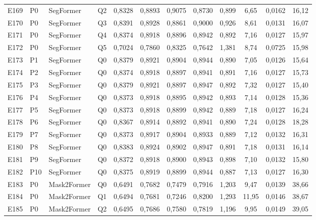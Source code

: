 \begin{longtable}{lllllccccccc}
E169 & P0 & SegFormer & Q2 & 0{,}8328 & 0{,}8893 & 0{,}9075 & 0{,}8730 & 0{,}899 & 6{,}65 & 0{,}0162 & 16{,}12 \\
E170 & P0 & SegFormer & Q3 & 0{,}8391 & 0{,}8928 & 0{,}8861 & 0{,}9000 & 0{,}926 & 8{,}61 & 0{,}0131 & 16{,}07 \\
E171 & P0 & SegFormer & Q4 & 0{,}8374 & 0{,}8918 & 0{,}8896 & 0{,}8942 & 0{,}892 & 7{,}16 & 0{,}0127 & 15{,}97 \\
E172 & P0 & SegFormer & Q5 & 0{,}7024 & 0{,}7860 & 0{,}8325 & 0{,}7642 & 1{,}381 & 8{,}74 & 0{,}0725 & 15{,}98 \\
E173 & P1 & SegFormer & Q0 & 0{,}8379 & 0{,}8921 & 0{,}8904 & 0{,}8944 & 0{,}890 & 7{,}05 & 0{,}0126 & 15{,}64 \\
E174 & P2 & SegFormer & Q0 & 0{,}8374 & 0{,}8918 & 0{,}8897 & 0{,}8941 & 0{,}891 & 7{,}16 & 0{,}0127 & 15{,}73 \\
E175 & P3 & SegFormer & Q0 & 0{,}8379 & 0{,}8921 & 0{,}8897 & 0{,}8947 & 0{,}892 & 7{,}32 & 0{,}0127 & 15{,}40 \\
E176 & P4 & SegFormer & Q0 & 0{,}8373 & 0{,}8918 & 0{,}8895 & 0{,}8942 & 0{,}893 & 7{,}14 & 0{,}0128 & 15{,}36 \\
E177 & P5 & SegFormer & Q0 & 0{,}8373 & 0{,}8918 & 0{,}8899 & 0{,}8942 & 0{,}889 & 7{,}18 & 0{,}0127 & 16{,}24 \\
E178 & P6 & SegFormer & Q0 & 0{,}8367 & 0{,}8914 & 0{,}8892 & 0{,}8941 & 0{,}890 & 7{,}24 & 0{,}0128 & 18{,}28 \\
E179 & P7 & SegFormer & Q0 & 0{,}8373 & 0{,}8917 & 0{,}8904 & 0{,}8933 & 0{,}889 & 7{,}12 & 0{,}0132 & 16{,}31 \\
E180 & P8 & SegFormer & Q0 & 0{,}8383 & 0{,}8924 & 0{,}8902 & 0{,}8947 & 0{,}891 & 7{,}18 & 0{,}0131 & 16{,}14 \\
E181 & P9 & SegFormer & Q0 & 0{,}8372 & 0{,}8918 & 0{,}8900 & 0{,}8943 & 0{,}898 & 7{,}10 & 0{,}0132 & 15{,}80 \\
E182 & P10 & SegFormer & Q0 & 0{,}8375 & 0{,}8919 & 0{,}8899 & 0{,}8944 & 0{,}887 & 7{,}13 & 0{,}0127 & 16{,}30 \\
E183 & P0 & Mask2Former & Q0 & 0{,}6491 & 0{,}7682 & 0{,}7479 & 0{,}7916 & 1{,}203 & 9{,}47 & 0{,}0139 & 38{,}66 \\
E184 & P0 & Mask2Former & Q1 & 0{,}6494 & 0{,}7681 & 0{,}7246 & 0{,}8200 & 1{,}293 & 11{,}95 & 0{,}0146 & 38{,}67 \\
E185 & P0 & Mask2Former & Q2 & 0{,}6495 & 0{,}7686 & 0{,}7580 & 0{,}7819 & 1{,}196 & 9{,}95 & 0{,}0149 & 39{,}05 \\

\end{longtable}
